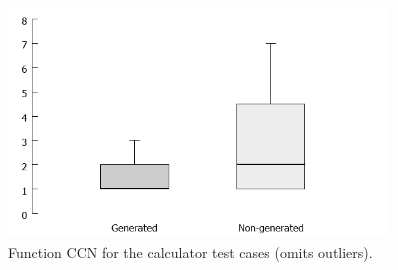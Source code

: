 \begin{figure}[h!]
\centering
\includegraphics[width=0.9\textwidth]{figures/Lizard_Calculator_CCN.png}
\caption[Function CCN for the calculator test cases.]{Function CCN for the calculator test cases (omits outliers).}
\label{fig:Lizard_Calculator_CCN}
\end{figure}






